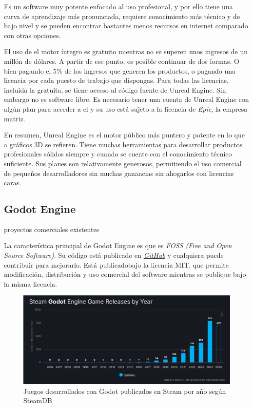 Es un software muy potente enfocado al uso profesional, y por ello tiene una curva de aprendizaje más pronunciada, requiere conocimiento más técnico y de bajo nivel y se pueden encontrar bastantes menos recursos en internet comparado con otras opciones.

El uso de el motor íntegro es gratuito mientras no se superen unos ingresos de un millón de dólares. A partir de ese punto, es posible continuar de dos formas. O bien pagando el 5\% de los ingresos que generen los productos, o pagando una licencia por cada puesto de trabajo que dispongas. Para todas las licencias, incluida la gratuita, se tiene acceso al código fuente de Unreal Engine. Sin embargo no es software libre. Es necesario tener una cuenta de Unreal Engine con algún plan para acceder a el y su uso está sujeto a la licencia de \textit{Epic}, la empresa matriz.

En resumen, Unreal Engine es el motor público más puntero y potente en lo que a gráficos 3D se refieren. Tiene muchas herramientas para desarrollar productos profesionales sólidos siempre y cuando se cuente con el conocimiento técnico suficiente. Sus planes son relativamente generosos, permitiendo el uso comercial de pequeños desarrolladores sin muchas ganancias sin ahogarlos con licencias caras.

\subsection{Godot Engine}

proyectos comerciales existentes



La característica principal de Godot Engine\cite{godot} es que es \textit{FOSS (Free and Open Source Software)}. Su código está publicado en \textit{\href{https://github.com/godotengine/godot}{GitHub}} y cualquiera puede contribuir para mejorarlo. Está publicadobajo la licencia MIT, que permite modificación, distribución y uso comercial del software mientras se publique bajo la misma licencia.

\begin{figure}[h]
    \centering
    \includegraphics[scale=0.35]{img/godot-by-year.png}
    \caption[Juegos publicados en Godot por año]{Juegos desarrollados con Godot publicados en Steam por año según SteamDB\cite{steamdb}}
    \label{fig:godotbyyear}
\end{figure}

